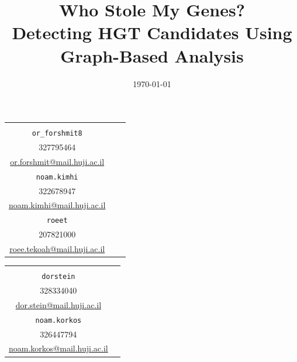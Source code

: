 \documentclass[11pt]{article}
\title{\textbf{Who Stole My Genes?}\\Detecting HGT Candidates Using Graph-Based Analysis}
\author{}
\date{}
\begin{document}
	\maketitle
	\vspace{-50pt}
	
	\begin{center}
		\renewcommand{\arraystretch}{1.15}
		\setlength{\tabcolsep}{10pt}
		
		\begin{tabular}{ccc}
			\begin{minipage}[t]{0.30\textwidth}\centering
				\textbf{Or Forshmit}\\[-1pt]
				\footnotesize\texttt{or\_forshmit8}\\[-1pt]
				\footnotesize 327795464\\[-1pt]
				\footnotesize\url{or.forshmit@mail.huji.ac.il}
			\end{minipage}
			&
			\begin{minipage}[t]{0.30\textwidth}\centering
				\textbf{Noam Kimhi}\\[-1pt]
				\footnotesize\texttt{noam.kimhi}\\[-1pt]
				\footnotesize 322678947\\[-1pt]
				\footnotesize\url{noam.kimhi@mail.huji.ac.il}
			\end{minipage}
			&
			\begin{minipage}[t]{0.30\textwidth}\centering
				\textbf{Roee Tekoah}\\[-1pt]
				\footnotesize\texttt{roeet}\\[-1pt]
				\footnotesize 207821000\\[-1pt]
				\footnotesize\url{roee.tekoah@mail.huji.ac.il}
			\end{minipage}
		\end{tabular}
		
		\vspace{10pt}
		
		\begin{tabular}{cc}
			\begin{minipage}[t]{0.30\textwidth}\centering
				\textbf{Dor Stein}\\[-1pt]
				\footnotesize\texttt{dorstein}\\[-1pt]
				\footnotesize 328334040\\[-1pt]
				\footnotesize\url{dor.stein@mail.huji.ac.il}
			\end{minipage}
			&
			\begin{minipage}[t]{0.30\textwidth}\centering
				\textbf{Noam Korkos}\\[-1pt]
				\footnotesize\texttt{noam.korkos}\\[-1pt]
				\footnotesize 326447794\\[-1pt]
				\footnotesize\url{noam.korkos@mail.huji.ac.il}
			\end{minipage}
		\end{tabular}
		
		\vspace{20pt}
		
		\href{https://github.com/noam-kimhi/Who-Stole-My-Genes/}
		{\Large \faGithub} \\[5pt]
		\date{\today}
	\end{center}
	
\end{document}
